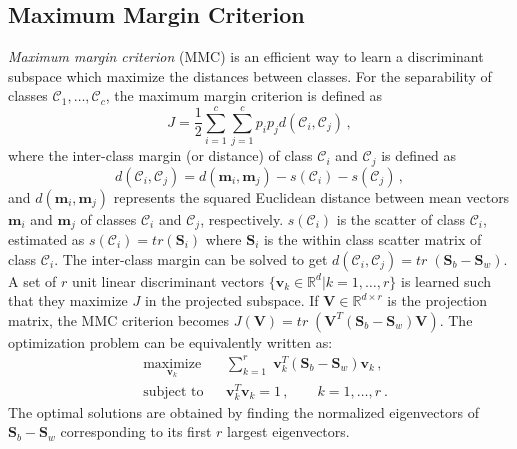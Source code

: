 \documentclass[runningheads]{llncs}
\begin{document}
\subsection{Maximum Margin Criterion}
\label{ssec:MMC}
\textit{Maximum margin criterion} (MMC) \cite{haifeng:mmc,mmc:pami} is an efficient way to learn a discriminant subspace which maximize the distances between classes.
For the separability of classes $\mathcal{C}_1,\ldots,\mathcal{C}_c$, the maximum margin criterion is defined as
\begin{equation}
\label{eqn:MMC1}
J  = \frac{1}{2} \sum\limits_{i=1}^{c} \sum\limits_{j=1}^{c}  \textit{p}_i \textit{p}_j d(\mathcal{C}_i,\mathcal{C}_j) \,,
\end{equation}
where the inter-class margin (or distance) of class $\mathcal{C}_i$ and $\mathcal{C}_j$ is defined as
\begin{equation}
\label{eqn:MMC2}
d(\mathcal{C}_i,\mathcal{C}_j) = d(\mathbf{m}_i,\mathbf{m}_j) - s(\mathcal{C}_i) - s(\mathcal{C}_j) \,,
\end{equation}
and $d(\mathbf{m}_i,\mathbf{m}_j)$ represents the squared Euclidean distance between mean vectors $\mathbf{m}_i$ and $\mathbf{m}_j$ of classes $\mathcal{C}_i$ and $\mathcal{C}_j$, respectively. $s(\mathcal{C}_i)$ is the scatter of class $\mathcal{C}_i$, estimated as $s(\mathcal{C}_i) = tr(\mathbf{S}_i)$ where $\mathbf{S}_i$ is the within class scatter matrix of class $\mathcal{C}_i$. The inter-class margin can be solved to get $d(\mathcal{C}_i,\mathcal{C}_j)  = \textit{tr} \;  (\mathbf{S}_b  -  \mathbf{S}_w)$.
A set of $r$ unit linear discriminant vectors $\{\mathbf{v}_k \in \mathbb{R}^{d} | k=1,\ldots,r\}$ is learned such that they maximize $J$ in the projected subspace.
If $\mathbf{V} \in \mathbb{R}^{d \times r}$ is the projection matrix, the MMC criterion becomes $J(\mathbf{V})  = \textit{tr} \;  (\mathbf{V}^T (\mathbf{S}_b  -  \mathbf{S}_w) \mathbf{V})$. The optimization problem can be equivalently written as:
\begin{equation}
\begin{aligned}
& \underset{\mathbf{v}_{k}}{\text{maximize}} & &\sum\limits_{k=1}^r \;  \mathbf{v}^T_{k} (\mathbf{S}_b  -  \mathbf{S}_w) \mathbf{v}_{k} \,,\\
\label{eqn:OptMMC}
& \text{subject to}     & & \mathbf{v}^T_{k} \mathbf{v}_{k} = 1 \,, \qquad k=1,\ldots,r \ .
\end{aligned}
\end{equation}
The optimal solutions are obtained by finding the normalized eigenvectors of $\mathbf{S}_b - \mathbf{S}_w$ corresponding to its first $r$ largest eigenvectors.
\end{document}
